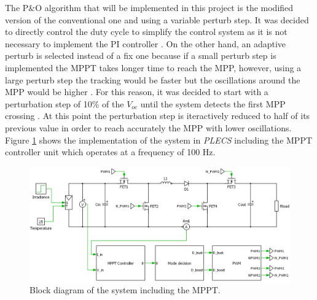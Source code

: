 The P\&O algorithm that will be implemented in this project is the modified version of the conventional one and using a variable perturb step. It was decided to directly control the duty cycle to simplify the control system as it is not necessary to implement the PI controller . On the other hand, an adaptive perturb is selected instead of a fix one because if a small perturb step is implemented the MPPT takes longer time to reach the MPP, however, using a large perturb step the tracking would be faster but the oscillations around the MPP would be higher . For this reason, it was decided to start with a perturbation step of 10\% of the $V_{oc}$ until the system detects the first MPP crossing . At this point the perturbation step is iteractively reduced to half of its previous value in order to reach accurately the MPP with lower oscillations. Figure \ref{BD_POalgorithm} shows the implementation of the system in \textit{PLECS} including the MPPT controller unit which operates at a frequency of 100 Hz. 

\begin{figure}[H]
	\begin{center}
		\includegraphics[width=\textwidth]{../Pictures/BD_implementation_POalgorithm}
		\caption{Block diagram of the system including the MPPT.}
		\label{BD_POalgorithm}
	\end{center}	
\end{figure}

